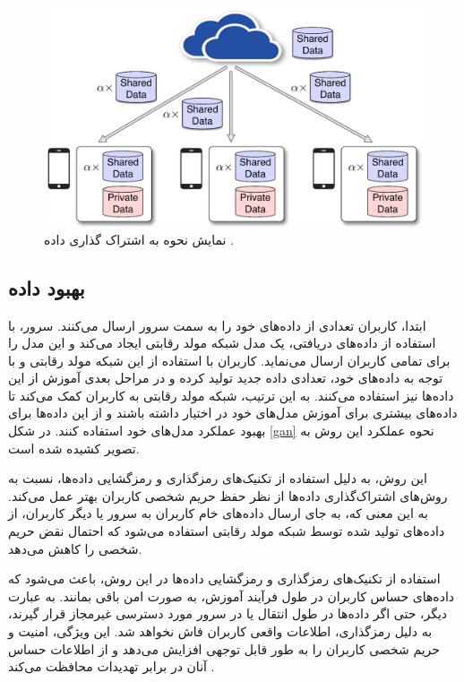  \begin{figure}[t]
	\centering
	\includegraphics[scale=0.9]{images/chap3/share_data.png}%
	\caption{%
		نمایش نحوه به اشتراک‌ گذاری داده
		\cite{zhao2018federated}%
		.
	}
	\label{share_data}
	\centering
\end{figure}


\subsection{
	بهبود داده%
}
ابتدا، کاربران تعدادی از داده‌های خود را به سمت سرور ارسال می‌کنند. سرور، با استفاده از داده‌های دریافتی، یک مدل شبکه مولد رقابتی%
ایجاد می‌کند و این مدل را برای تمامی کاربران ارسال می‌نماید. کاربران با استفاده از این شبکه مولد رقابتی و با توجه به داده‌های خود، تعدادی داده جدید تولید کرده و در مراحل بعدی آموزش از این داده‌ها نیز استفاده می‌کنند. به این ترتیب، شبکه مولد رقابتی به کاربران کمک می‌کند تا داده‌های بیشتری برای آموزش مدل‌های خود در اختیار داشته باشند و از این داده‌ها برای بهبود عملکرد مدل‌های خود استفاده کنند. در شکل
\ref{gan}
نحوه عملکرد این روش به تصویر کشیده شده است.

این روش، به دلیل استفاده از تکنیک‌های رمزگذاری%
و رمزگشایی%
داده‌ها، نسبت به روش‌های اشتراک‌گذاری داده‌ها از نظر حفظ حریم شخصی کاربران بهتر عمل می‌کند. به این معنی که، به جای ارسال داده‌های خام کاربران به سرور یا دیگر کاربران، از داده‌های تولید شده توسط شبکه مولد رقابتی استفاده می‌شود که احتمال نقض حریم شخصی را کاهش می‌دهد.

استفاده از تکنیک‌های رمزگذاری و رمزگشایی داده‌ها در این روش، باعث می‌شود که داده‌های حساس کاربران در طول فرآیند آموزش، به صورت امن باقی بمانند. به عبارت دیگر، حتی اگر داده‌ها در طول انتقال یا در سرور مورد دسترسی غیرمجاز قرار گیرند، به دلیل رمزگذاری، اطلاعات واقعی کاربران فاش نخواهد شد. این ویژگی، امنیت و حریم شخصی کاربران را به طور قابل توجهی افزایش می‌دهد و از اطلاعات حساس آنان در برابر تهدیدات محافظت می‌کند
\cite{jeong2018communication}.

